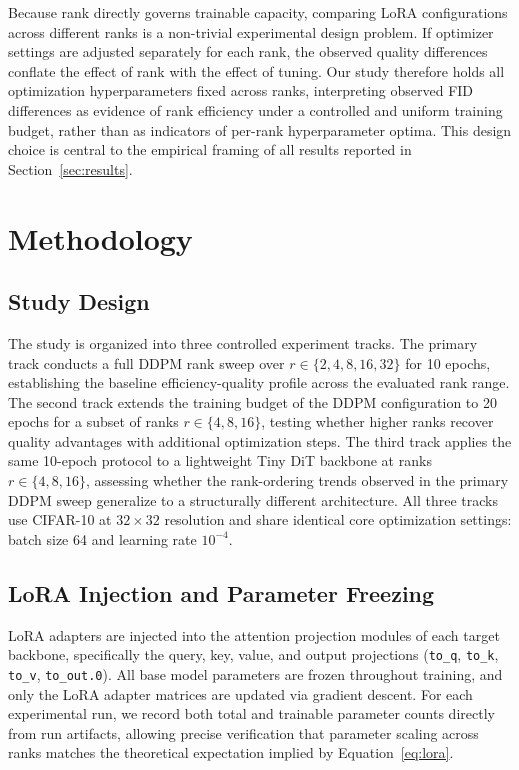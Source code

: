 \documentclass[pdflatex,sn-mathphys-num]{Springer_format/sn-jnl}
\begin{document}
  Because rank directly governs trainable capacity, comparing LoRA configurations across
  different ranks is a non-trivial experimental design problem. If optimizer settings are
  adjusted separately for each rank, the observed quality differences conflate the effect of
  rank with the effect of tuning. Our study therefore holds all optimization hyperparameters
  fixed across ranks, interpreting observed FID differences as evidence of rank efficiency
  under a controlled and uniform training budget, rather than as indicators of per-rank
  hyperparameter optima. This design choice is central to the empirical framing of all
  results reported in Section~\ref{sec:results}.
  
  \section{Methodology}
  \label{sec:methodology}
  
  \subsection{Study Design}
  
  The study is organized into three controlled experiment tracks. The primary track conducts
  a full DDPM rank sweep over $r \in \{2, 4, 8, 16, 32\}$ for 10 epochs, establishing the
  baseline efficiency-quality profile across the evaluated rank range. The second track
  extends the training budget of the DDPM configuration to 20 epochs for a subset of ranks
  $r \in \{4, 8, 16\}$, testing whether higher ranks recover quality advantages with
  additional optimization steps. The third track applies the same 10-epoch protocol to a
  lightweight Tiny DiT backbone at ranks $r \in \{4, 8, 16\}$, assessing whether the
  rank-ordering trends observed in the primary DDPM sweep generalize to a structurally
  different architecture. All three tracks use CIFAR-10 at $32 \times 32$ resolution and
  share identical core optimization settings: batch size 64 and learning rate $10^{-4}$.
  
  \subsection{LoRA Injection and Parameter Freezing}
  
  LoRA adapters are injected into the attention projection modules of each target backbone,
  specifically the query, key, value, and output projections (\texttt{to\_q}, \texttt{to\_k},
  \texttt{to\_v}, \texttt{to\_out.0}). All base model parameters are frozen throughout
  training, and only the LoRA adapter matrices are updated via gradient descent. For each
  experimental run, we record both total and trainable parameter counts directly from run
  artifacts, allowing precise verification that parameter scaling across ranks matches the
  theoretical expectation implied by Equation~\ref{eq:lora}.
  
\end{document}
